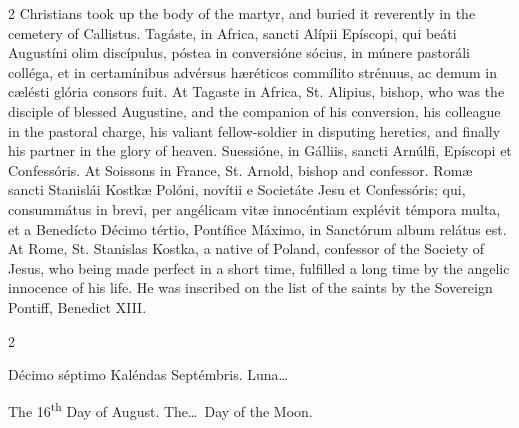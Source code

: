 \begin{paracol}{2}
 Christians took up the body of the martyr, and buried it reverently in the 
 cemetery of Callistus.
\switchcolumn*
{}
Tagáste, in Africa, 
 sancti Alípii Epíscopi, qui beáti Augustíni olim discípulus, póstea in 
 conversióne sócius, in múnere pastoráli colléga, et in certamínibus advérsus 
 hæréticos commílito strénuus, ac demum in cælésti glória consors fuit.
\switchcolumn
{}
At Tagaste in Africa, St. Alipius, 
 bishop, who was the disciple of blessed Augustine, and the companion of his 
 conversion, his colleague in the pastoral charge, his valiant fellow-soldier 
 in disputing heretics, and finally his partner in the glory of heaven.
\switchcolumn*
{}
Suessióne, in Gálliis, 
 sancti Arnúlfi, Epíscopi et Confessóris.
\switchcolumn
{}
At Soissons in France, St. Arnold, 
 bishop and confessor.
\switchcolumn*
{}
Romæ sancti Stanislái 
 Kostkæ Polóni, novítii e Societáte Jesu et Confessóris; qui, consummátus in 
 brevi, per angélicam vitæ innocéntiam explévit témpora multa, et a Benedícto 
 Décimo tértio, Pontífice Máximo, in Sanctórum album relátus est.
\switchcolumn
{}
At Rome, St. Stanislas Kostka, a 
 native of Poland, confessor of the Society of Jesus, who being made perfect 
 in a short time, fulfilled a long time by the angelic innocence of his life. 
 He was inscribed on the list of the saints by the Sovereign Pontiff, 
 Benedict XIII.
\switchcolumn*
{}
\end{paracol}


\begin{paracol}{2}
\begin{center}{\color{gregoriocolor} Décimo séptimo Kaléndas Septémbris. 
 Luna\dots\ }\end{center}
\switchcolumn
{}
\begin{center}{\color{gregoriocolor} The 
 16\textsuperscript{th} Day of 
 August. The\dots\ Day of the Moon.}\end{center}
\end{paracol}

